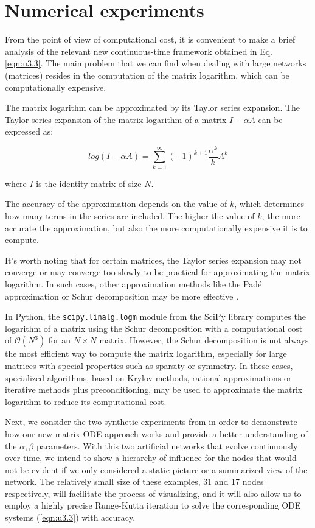 \chapter{Numerical experiments}
\label{chap:expe}

From the point of view of computational cost, it is convenient to make a brief analysis of the relevant new continuous-time framework obtained in Eq. \ref{eqn:u3.3}. The main problem that we can find when dealing with large networks (matrices) resides in the computation of the matrix logarithm, which can be computationally expensive.

The matrix logarithm can be approximated by its Taylor series expansion. The Taylor series expansion of the matrix logarithm of a matrix $I - \alpha A$ can be expressed as:

$$log(I - \alpha A) = \sum_{k=1}^{\infty} (-1)^{k+1}\frac{\alpha^k}{k}A^k$$

where $I$ is the identity matrix of size $N$.

The accuracy of the approximation depends on the value of $k$, which determines how many terms in the series are included. The higher the value of $k$, the more accurate the approximation, but also the more computationally expensive it is to compute.

It's worth noting that for certain matrices, the Taylor series expansion may not converge or may converge too slowly to be practical for approximating the matrix logarithm. In such cases, other approximation methods like the Padé approximation or Schur decomposition may be more effective \cite{higham2008functions}.

In Python, the \texttt{scipy.linalg.logm} module from the SciPy library computes the logarithm of a matrix using the Schur decomposition with a computational cost of $\mathcal{O}(N^3)$ for an $N \times N$ matrix. However, the Schur decomposition is not always the most efficient way to compute the matrix logarithm, especially for large matrices with special properties such as sparsity or symmetry. In these cases, specialized algorithms, based on Krylov methods, rational approximations or iterative methods plus preconditioning, may be used to approximate the matrix logarithm to reduce its computational cost.

Next, we consider the two synthetic experiments from \cite{grindrod2014dynamical} in order to demonstrate how our new matrix ODE approach works and provide a better understanding of the $\alpha,\beta$ parameters. With this two artificial networks that evolve continuously over time, we intend to show a hierarchy of influence for the nodes that would not be evident if we only considered a static picture or a summarized view of the network. The relatively small size of these examples, 31 and 17 nodes respectively, will facilitate the process of visualizing, and it will also allow us to employ a highly precise Runge-Kutta iteration to solve the corresponding ODE systems (\ref{eqn:u3.3}) with accuracy.

